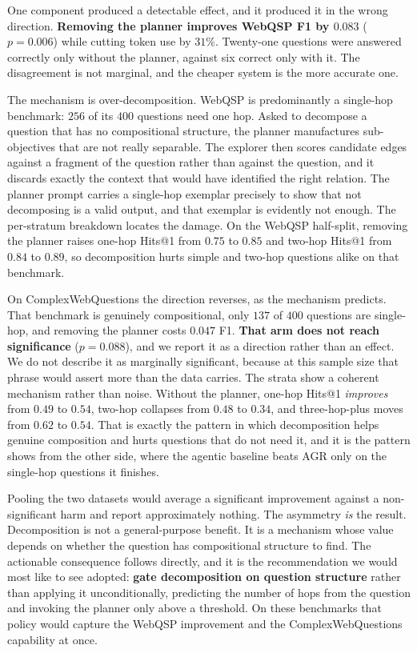 One component produced a detectable effect, and it produced it in the
wrong direction. \textbf{Removing the planner improves WebQSP F1 by
$0.083$} ($p = 0.006$) while cutting token use by $31\%$. Twenty-one
questions were answered correctly only without the planner, against six
correct only with it. The disagreement is not marginal, and the cheaper
system is the more accurate one.

The mechanism is over-decomposition. WebQSP is predominantly a
single-hop benchmark: $256$ of its $400$ questions need one hop. Asked
to decompose a question that has no compositional structure, the planner
manufactures sub-objectives that are not really separable. The explorer
then scores candidate edges against a fragment of the question rather
than against the question, and it discards exactly the context that
would have identified the right relation. The planner prompt carries a
single-hop exemplar precisely to show that not decomposing is a valid
output, and that exemplar is evidently not enough. The per-stratum
breakdown locates the damage. On the WebQSP half-split, removing the
planner raises one-hop Hits@1 from $0.75$ to $0.85$ and two-hop Hits@1
from $0.84$ to $0.89$, so decomposition hurts simple and two-hop
questions alike on that benchmark.

On ComplexWebQuestions the direction reverses, as the mechanism
predicts. That benchmark is genuinely compositional, only $137$ of $400$
questions are single-hop, and removing the planner costs $0.047$ F1.
\textbf{That arm does not reach significance} ($p = 0.088$), and we
report it as a direction rather than an effect. We do not describe it as
marginally significant, because at this sample size that phrase would
assert more than the data carries. The strata show a coherent mechanism
rather than noise. Without the planner, one-hop Hits@1 \emph{improves}
from $0.49$ to $0.54$, two-hop collapses from $0.48$ to $0.34$, and
three-hop-plus moves from $0.62$ to $0.54$. That is exactly the pattern
in which decomposition helps genuine composition and hurts questions
that do not need it, and it is the pattern  shows
from the other side, where the agentic baseline beats AGR only on the
single-hop questions it finishes.

Pooling the two datasets would average a significant improvement against
a non-significant harm and report approximately nothing. The asymmetry
\emph{is} the result. Decomposition is not a general-purpose benefit. It
is a mechanism whose value depends on whether the question has
compositional structure to find. The actionable consequence follows
directly, and it is the recommendation we would most like to see
adopted: \textbf{gate decomposition on question structure} rather than
applying it unconditionally, predicting the number of hops from the
question and invoking the planner only above a threshold. On these
benchmarks that policy would capture the WebQSP improvement and the
ComplexWebQuestions capability at once.

